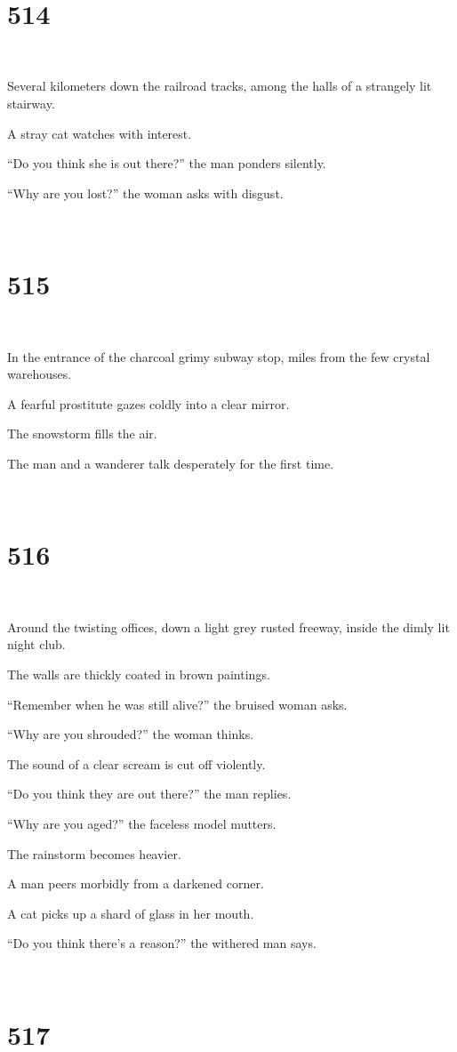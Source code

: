 \documentclass{report}
\begin{document}
~
\chapter*{514}
~

Several kilometers down the railroad tracks, among the halls of a strangely lit stairway.

A stray cat watches with interest.

``Do you think she is out there?'' the man ponders silently.

``Why are you lost?'' the woman asks with disgust.

~
\chapter*{515}
~

In the entrance of the charcoal grimy subway stop, miles from the few crystal warehouses.

A fearful prostitute gazes coldly into a clear mirror.

The snowstorm fills the air.

The man and a wanderer talk desperately for the first time.

~
\chapter*{516}
~

Around the twisting offices, down a light grey rusted freeway, inside the dimly lit night club.

The walls are thickly coated in brown paintings.

``Remember when he was still alive?'' the bruised woman asks.

``Why are you shrouded?'' the woman thinks.

The sound of a clear scream is cut off violently.

``Do you think they are out there?'' the man replies.

``Why are you aged?'' the faceless model mutters.

The rainstorm becomes heavier.

A man peers morbidly from a darkened corner.

A cat picks up a shard of glass in her mouth.

``Do you think there's a reason?'' the withered man says.

~
\chapter*{517}
~
\end{document}
